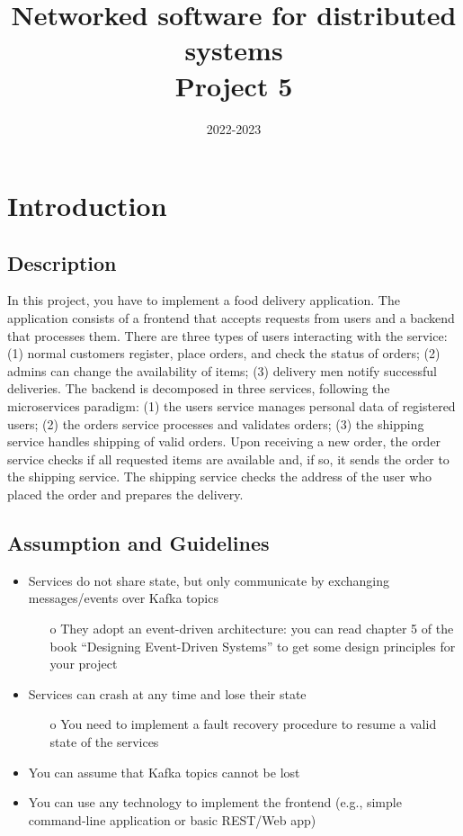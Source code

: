 \documentclass[11pt]{article}
\title{Networked software for distributed systems\\Project 5}
\date{2022-2023}
\begin{document}


\tableofcontents
\cleardoublepage

\section{Introduction}
\subsection{Description}
In this project, you have to implement a food delivery application. The application consists of a frontend that accepts requests from users and a backend that processes them. There are three types of users interacting with the service: (1) normal customers register, place orders, and check the status of orders; (2) admins can change the availability of items; (3) delivery men notify successful deliveries. The backend is decomposed in three services, following the microservices paradigm: (1) the users service manages personal data of registered users; (2) the orders service processes and validates orders; (3) the shipping service handles shipping of valid orders. Upon receiving a new order, the order service checks if all requested items are available and, if so, it sends the order to the shipping service. The shipping service checks the address of the user who placed the order and prepares the delivery. 

\subsection{Assumption and Guidelines}
\begin{itemize}
    \item Services do not share state, but only communicate by exchanging messages/events over Kafka topics
    \begin{itemize}
        \item[o] They adopt an event-driven architecture: you can read chapter 5 of the book “Designing Event-Driven Systems” to get some design principles for your project
    \end{itemize}
    \item Services can crash at any time and lose their state
    \begin{itemize}
        \item[o] You need to implement a fault recovery procedure to resume a valid state of the services
    \end{itemize}
    \item You can assume that Kafka topics cannot be lost
    \item You can use any technology to implement the frontend (e.g., simple command-line application or basic REST/Web app)
\end{itemize}
\end{document}
